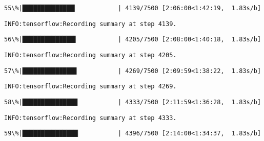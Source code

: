 \documentclass[11pt]{article}
\begin{document}
    \begin{Verbatim}[commandchars=\\\{\}]
 55\%|██████████████▎           | 4139/7500 [2:06:00<1:42:19,  1.83s/b]
    \end{Verbatim}

    \begin{Verbatim}[commandchars=\\\{\}]
INFO:tensorflow:Recording summary at step 4139.

    \end{Verbatim}

    \begin{Verbatim}[commandchars=\\\{\}]
 56\%|██████████████▌           | 4205/7500 [2:08:00<1:40:18,  1.83s/b]
    \end{Verbatim}

    \begin{Verbatim}[commandchars=\\\{\}]
INFO:tensorflow:Recording summary at step 4205.

    \end{Verbatim}

    \begin{Verbatim}[commandchars=\\\{\}]
 57\%|██████████████▊           | 4269/7500 [2:09:59<1:38:22,  1.83s/b]
    \end{Verbatim}

    \begin{Verbatim}[commandchars=\\\{\}]
INFO:tensorflow:Recording summary at step 4269.

    \end{Verbatim}

    \begin{Verbatim}[commandchars=\\\{\}]
 58\%|███████████████           | 4333/7500 [2:11:59<1:36:28,  1.83s/b]
    \end{Verbatim}

    \begin{Verbatim}[commandchars=\\\{\}]
INFO:tensorflow:Recording summary at step 4333.

    \end{Verbatim}

    \begin{Verbatim}[commandchars=\\\{\}]
 59\%|███████████████▏          | 4396/7500 [2:14:00<1:34:37,  1.83s/b]
    \end{Verbatim}
\end{document}
